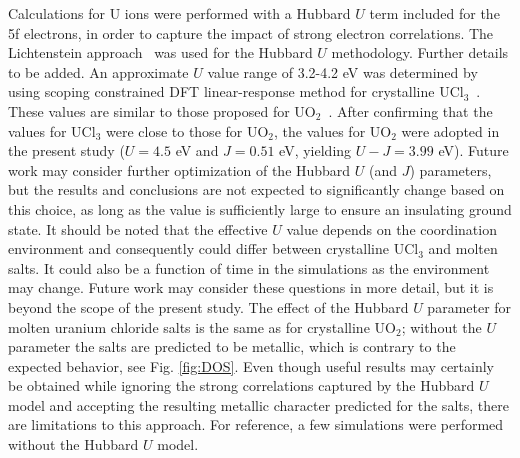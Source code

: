 \documentclass[preprint,3p,10pt,twocolumn,number,sort&compress]{elsarticle}
\begin{document}
Calculations for U ions were performed with a Hubbard $U$ term included for the 5f electrons, in order to capture the impact of strong electron correlations. 
The Lichtenstein approach~\cite{PhysRevB.52.R5467} was used for the Hubbard $U$ methodology. {\color{red} Further details to be added.} An approximate $U$ value range of 3.2-4.2 eV was determined by using scoping constrained DFT linear-response method for crystalline UCl$_3$~\cite{PhysRevB.71.035105}. 
These values are similar to those proposed for UO$_2$~\cite{dudarev}. After confirming that the values for UCl$_3$ were close to those for UO$_2$, the values for UO$_2$ were adopted in the present study ($U=4.5$ eV and $J=0.51$ eV, yielding $U-J=3.99$ eV). Future work may consider further optimization of the Hubbard $U$ (and $J$) parameters, but the results and conclusions are not expected to significantly change based on this choice, as long as the value is sufficiently large to ensure an insulating ground state. It should be noted that the effective $U$ value depends on the coordination environment and consequently could differ between crystalline UCl$_3$ and molten salts. It could also be a function of time in the simulations as the environment may change. Future work may consider these questions in more detail, but it is beyond the scope of the present study. The effect of the Hubbard $U$ parameter for molten uranium chloride salts is the same as for crystalline UO$_2$; without the $U$ parameter the salts are predicted to be metallic, which is contrary to the expected behavior, see Fig. \ref{fig:DOS}. 
Even though useful results may certainly be obtained while ignoring the strong correlations captured by the Hubbard $U$  model and accepting the resulting metallic character predicted for the salts, there are limitations to this approach. For reference, a few simulations were performed without the Hubbard $U$ model. 
\end{document}
